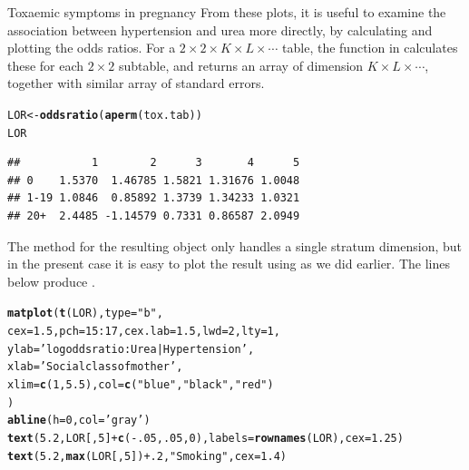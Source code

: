 \documentclass[11pt]{book}\usepackage[]{graphicx}\usepackage[]{color}
\makeatletter
\newcommand{\hlnum}[1]{\textcolor[rgb]{0.686,0.059,0.569}{#1}}%
\newcommand{\hlstr}[1]{\textcolor[rgb]{0.192,0.494,0.8}{#1}}%
\newcommand{\hlopt}[1]{\textcolor[rgb]{0,0,0}{#1}}%
\newcommand{\hlstd}[1]{\textcolor[rgb]{0.345,0.345,0.345}{#1}}%
\newcommand{\hlkwb}[1]{\textcolor[rgb]{0.69,0.353,0.396}{#1}}%
\newcommand{\hlkwc}[1]{\textcolor[rgb]{0.333,0.667,0.333}{#1}}%
\newcommand{\hlkwd}[1]{\textcolor[rgb]{0.737,0.353,0.396}{\textbf{#1}}}%
\newenvironment{kframe}{%
 \def\at@end@of@kframe{}%
 \ifinner\ifhmode%
  \def\at@end@of@kframe{\end{minipage}}%
  \begin{minipage}{\columnwidth}%
 \fi\fi%
 \def\FrameCommand##1{\hskip\@totalleftmargin \hskip-\fboxsep
 \colorbox{shadecolor}{##1}\hskip-\fboxsep
     \hskip-\linewidth \hskip-\@totalleftmargin \hskip\columnwidth}%
 \MakeFramed {\advance\hsize-\width
   \@totalleftmargin\z@ \linewidth\hsize
   \@setminipage}}%
 {\par\unskip\endMakeFramed%
 \at@end@of@kframe}
\newenvironment{knitrout}{}{} %
\renewenvironment{knitrout}{\small\renewcommand{\baselinestretch}{.85}}{} %
\makeatother
\begin{document}
\begin{Example}[toxaemia]{Toxaemic symptoms in pregnancy}
From these plots, it is useful to examine the association between hypertension
and urea more directly, by calculating and plotting the odds ratios.
For a $2 \times 2 \times K \times L \times \cdots$ table,
the function  in  calculates these for each $2 \times 2$
subtable, and returns an array of dimension $K \times L \times \cdots$,
together with similar array of standard errors.
\begin{knitrout}
\color{fgcolor}\begin{kframe}
\begin{alltt}
\hlstd{LOR} \hlkwb{<-}\hlkwd{oddsratio}\hlstd{(}\hlkwd{aperm}\hlstd{(tox.tab))}
\hlstd{LOR}
\end{alltt}
\begin{verbatim}
##           1        2      3       4      5
## 0    1.5370  1.46785 1.5821 1.31676 1.0048
## 1-19 1.0846  0.85892 1.3739 1.34233 1.0321
## 20+  2.4485 -1.14579 0.7331 0.86587 2.0949
\end{verbatim}
\end{kframe}
\end{knitrout}
The  method for the resulting  object only
handles a single stratum dimension, but in the present case
it is easy to plot the result
using  as we did earlier.  The lines below produce .

\begin{knitrout}
\color{fgcolor}\begin{kframe}
\begin{alltt}
\hlkwd{matplot}\hlstd{(}\hlkwd{t}\hlstd{(LOR),} \hlkwc{type}\hlstd{=}\hlstr{"b"}\hlstd{,}
        \hlkwc{cex}\hlstd{=}\hlnum{1.5}\hlstd{,} \hlkwc{pch}\hlstd{=}\hlnum{15}\hlopt{:}\hlnum{17}\hlstd{,} \hlkwc{cex.lab}\hlstd{=}\hlnum{1.5}\hlstd{,} \hlkwc{lwd}\hlstd{=}\hlnum{2}\hlstd{,} \hlkwc{lty}\hlstd{=}\hlnum{1}\hlstd{,}
        \hlkwc{ylab}\hlstd{=}\hlstr{'log odds ratio: Urea | Hypertension'}\hlstd{,}
        \hlkwc{xlab}\hlstd{=}\hlstr{'Social class of mother'}\hlstd{,}
        \hlkwc{xlim}\hlstd{=}\hlkwd{c}\hlstd{(}\hlnum{1}\hlstd{,}\hlnum{5.5}\hlstd{),} \hlkwc{col}\hlstd{=}\hlkwd{c}\hlstd{(}\hlstr{"blue"}\hlstd{,} \hlstr{"black"}\hlstd{,} \hlstr{"red"}\hlstd{)}
       \hlstd{)}
\hlkwd{abline}\hlstd{(}\hlkwc{h}\hlstd{=}\hlnum{0}\hlstd{,} \hlkwc{col}\hlstd{=}\hlstr{'gray'}\hlstd{)}
\hlkwd{text}\hlstd{(}\hlnum{5.2}\hlstd{, LOR[,}\hlnum{5}\hlstd{]}\hlopt{+}\hlkwd{c}\hlstd{(}\hlopt{-}\hlnum{.05}\hlstd{,}\hlnum{.05}\hlstd{,} \hlnum{0}\hlstd{),} \hlkwc{labels}\hlstd{=}\hlkwd{rownames}\hlstd{(LOR),} \hlkwc{cex}\hlstd{=}\hlnum{1.25}\hlstd{)}
\hlkwd{text}\hlstd{(}\hlnum{5.2}\hlstd{,} \hlkwd{max}\hlstd{(LOR[,}\hlnum{5}\hlstd{])}\hlopt{+}\hlnum{.2}\hlstd{,} \hlstr{"Smoking"}\hlstd{,} \hlkwc{cex}\hlstd{=}\hlnum{1.4}\hlstd{)}
\end{alltt}
\end{kframe}\begin{figure}[!htbp]



\end{figure}
\end{knitrout}
\end{Example}
\end{document}
